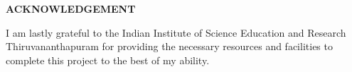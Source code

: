 \begin{center}
{\Large{\bf{ACKNOWLEDGEMENT}}}
\end{center}


\par
I am lastly grateful to the Indian Institute of Science Education and Research Thiruvananthapuram for providing the necessary resources and facilities to complete this project to the best of my ability.

\cleardoublepage